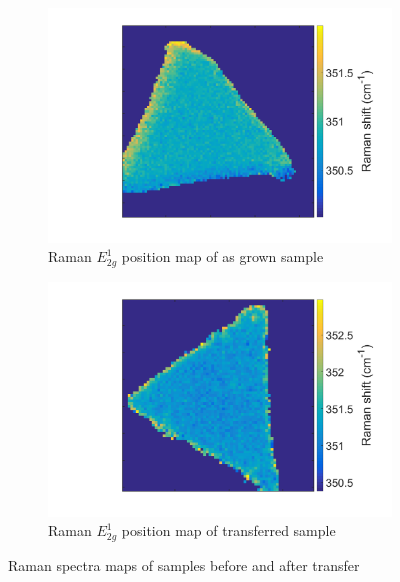 \begin{figure}[H]
\begin{center}
\begin{subfigure}[b]{0.4\textwidth}
			\includegraphics[scale=0.15]{Transfer/TransferRamanPositionEMapAsgrown.png}
			\caption{Raman $E^1_{2g}$ position map of as grown sample}
			\label{fig:TransferRamanPositionEMapAsgrown}
		\end{subfigure}
		\quad
		\begin{subfigure}[b]{0.4\textwidth}
			\includegraphics[scale=0.15]{Transfer/TransferRamanPositionEMapTransferred.png}
			\caption{Raman $E^1_{2g}$ position map of transferred sample}
			\label{fig:TransferRamanPositionEMapTransferred}
		\end{subfigure}
		\caption{Raman spectra maps of samples before and after transfer}
		\label{fig:TransferRamanMapsComparison}
	\end{center}
\end{figure}
	
